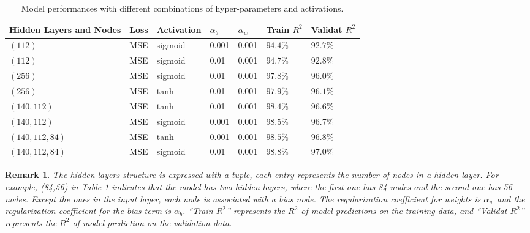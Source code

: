 \documentclass[thmsa,onecolumn,12pt]{article}%
\newtheorem{remark}{Remark}
\begin{document}
\begin{table}[!htb]
\caption{Model performances with different combinations of hyper-parameters and activations. }
\label{table1}
\centering%
\begin{tabular}{ p{3cm}  p{2cm}  p{2cm} p{1cm} p{1cm}p{2cm}p{2cm}  }
\toprule%
Hidden Layers and Nodes &Loss &Activation  & $\alpha_b$ & $\alpha_w$ &Train $R^2$ &Validat $R^2$\\
\toprule
$(112)$            	&MSE	     &sigmoid       &0.001   &0.001   &$94.4\%$        &$92.7\%$ \\
$(112)$              &MSE		&sigmoid       &0.01   &0.001   &$94.7\%$         &$92.8\%$ \\
$(256) $             &MSE		&sigmoid      &0.01    &0.001   &$97.8\%$         &$96.0\%$ \\
$(256) $             &MSE		&tanh           &0.01   &0.001   &$97.9\%$         &$96.1\%$ \\
$(140,112) $      &MSE		&tanh           &0.01      &0.001   &$98.4\%$         &$96.6\%$ \\
$(140,112) $      &MSE		&sigmoid           &0.001    &0.001    &$98.5\%$         &$96.7\%$ \\
$(140,112,84)$  &MSE		&tanh           &0.001      &0.001    &$98.5\%$         &$96.8\%$ \\
$(140,112,84)$  &MSE		&sigmoid           &0.01    &0.001    &$98.8\%$         &$97.0\%$ \\
\bottomrule
\end{tabular}
\end{table}


\begin{remark}
The hidden layers structure is expressed with a tuple, each entry represents the number of nodes in a hidden layer. For example, (84,56) in Table \ref{table1} indicates that the model has two hidden layers, where the first one has 84 nodes and the second one has 56 nodes. Except the ones in the input layer, each node is associated with a bias node. The regularization coefficient for weights is $\alpha_w$ and the regularization coefficient for the bias term is $\alpha_b$. ``Train $R^2$'' represents the $R^2$ of model predictions on the training data, and ``Validat $R^2$'' represents the $R^2$ of model prediction on the validation data.
\end{remark}
\end{document}
